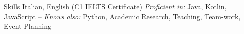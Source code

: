 \setPrefix{\faGlobeEurope}
\begin{rubric}{Skills}
\entry*[Languages]
	Italian, English (C{\Large 1} IELTS Certificate)
\setPrefix{\faLaptopCode}
	\textit{Proficient in:} Java, Kotlin, JavaScript -- \textit{Knows also:} Python, \Csh{} 
\setPrefix{\faCogs}
\entry*[Misc.]
	Academic Research, Teaching, Team-work, Event Planning
\end{rubric}
\resetPrefix{}
 